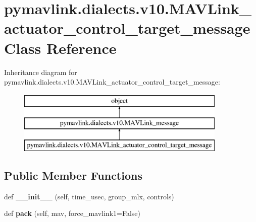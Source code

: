 \hypertarget{classpymavlink_1_1dialects_1_1v10_1_1MAVLink__actuator__control__target__message}{}\section{pymavlink.\+dialects.\+v10.\+M\+A\+V\+Link\+\_\+actuator\+\_\+control\+\_\+target\+\_\+message Class Reference}
\label{classpymavlink_1_1dialects_1_1v10_1_1MAVLink__actuator__control__target__message}
Inheritance diagram for pymavlink.\+dialects.\+v10.\+M\+A\+V\+Link\+\_\+actuator\+\_\+control\+\_\+target\+\_\+message\+:\begin{figure}[H]
\begin{center}
\leavevmode
\includegraphics[height=3.000000cm]{classpymavlink_1_1dialects_1_1v10_1_1MAVLink__actuator__control__target__message}
\end{center}
\end{figure}
\subsection*{Public Member Functions}
\begin{DoxyCompactItemize}
\item 
\mbox{\label{classpymavlink_1_1dialects_1_1v10_1_1MAVLink__actuator__control__target__message_a2e1e96e4a73bc981927faef174e7bc99}} 
def {\bfseries \+\_\+\+\_\+init\+\_\+\+\_\+} (self, time\+\_\+usec, group\+\_\+mlx, controls)
\item 
\mbox{\label{classpymavlink_1_1dialects_1_1v10_1_1MAVLink__actuator__control__target__message_a01e4fe880261dc056528f8314f7b52ec}} 
def {\bfseries pack} (self, mav, force\+\_\+mavlink1=False)
\end{DoxyCompactItemize}
